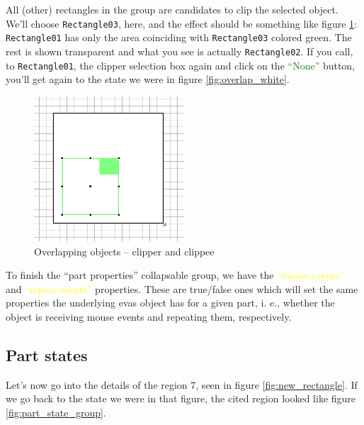\documentclass[a4paper]{profusion}
\newcommand{\GUIButton}[1]{\textcolor{green}{#1}} %
\newcommand{\GUIEditable}[1]{\textcolor{yellow}{#1}} %
\begin{document}
All (other) rectangles in the group are candidates to clip the
selected object. We'll choose \texttt{Rectangle03}, here, and the
effect should be something like figure \ref{fig:overlap_clipped}:
\texttt{Rectangle01} has only the area coinciding with
\texttt{Rectangle03} colored green. The rest is shown transparent and
what you see is actually \texttt{Rectangle02}. If you call, to
\texttt{Rectangle01}, the clipper selection box again and click on the
\GUIButton{``None''} button, you'll get again to the state we were in
figure \ref{fig:overlap_white}.

\begin{figure}[h!]
  \centering
  \includegraphics[width=0.5\textwidth]{images/rectangle_overlap_clipping.png}
  \caption{Overlapping objects -- clipper and clippee}
  \label{fig:overlap_clipped}
\end{figure}

To finish the ``part properties'' collapsable group, we have the
\GUIEditable{``mouse events''} and \GUIEditable{``repeat events''}
properties. These are true/false ones which will set the same
properties the underlying evas object has for a given part, i. e.,
whether the object is receiving mouse events and repeating them,
respectively.

\subsection{Part states}
\label{sec:part_states}

Let's now go into the details of the region 7, seen in figure
\ref{fig:new_rectangle}. If we go back to the state we were in that
figure, the cited region looked like figure
\ref{fig:part_state_group}.
\end{document}
